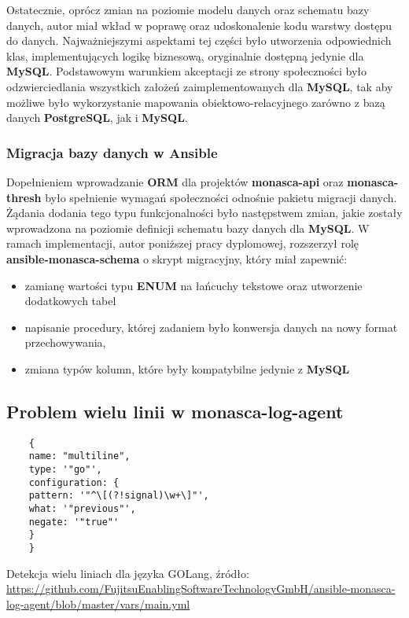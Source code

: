     Ostatecznie, oprócz zmian na poziomie modelu danych oraz schematu bazy danych, autor miał wkład w poprawę oraz udoskonalenie
    kodu warstwy dostępu do danych. Najważniejszymi aspektami tej części było utworzenia odpowiednich klas, implementujących logikę
    biznesową, oryginalnie dostępną jedynie dla \textbf{MySQL}. Podstawowym warunkiem akceptacji ze strony społeczności było
    odzwierciedlania wszystkich założeń zaimplementowanych dla \textbf{MySQL}, tak aby możliwe było wykorzystanie mapowania obiektowo-relacyjnego
    zarówno z bazą danych \textbf{PostgreSQL}, jak i \textbf{MySQL}.
    
    \subsubsection{Migracja bazy danych w Ansible}
    Dopełnieniem wprowadzanie \textbf{ORM} dla projektów \textbf{monasca-api} oraz \textbf{monasca-thresh} było spełnienie
    wymagań społeczności odnośnie pakietu migracji danych. Żądania dodania tego typu funkcjonalności było następstwem zmian, jakie
    zostały wprowadzona na poziomie definicji schematu bazy danych dla \textbf{MySQL}. W ramach implementacji, autor poniższej pracy dyplomowej,
    rozszerzył rolę \textbf{ansible-monasca-schema} o skrypt migracyjny, który miał zapewnić:
    \begin{itemize}
        \item zamianę wartości typu \textbf{ENUM} na łańcuchy tekstowe oraz utworzenie dodatkowych tabel
        \item napisanie procedury, której zadaniem było konwersja danych na nowy format przechowywania,
        \item zmiana typów kolumn, które były kompatybilne jedynie z \textbf{MySQL}
    \end{itemize}

\subsection{Problem wielu linii w monasca-log-agent}
\label{chapter:application_own:own_work:monasca_log_agent}

\begin{listing}[h]
    \begin{verbatim}
    {
    name: "multiline",
    type: '"go"',
    configuration: {
    pattern: '"^\[(?!signal)\w+\]"',
    what: '"previous"',
    negate: '"true"'
    }
    }
    \end{verbatim}
    \caption[Detekcja wielu liniach dla języka GOLang]{
        Detekcja wielu liniach dla języka GOLang, źródło: \url{https://github.com/FujitsuEnablingSoftwareTechnologyGmbH/ansible-monasca-log-agent/blob/master/vars/main.yml}}
    \label{chapter:application_own:own_work:monasca_log_agent:filter_example}
\end{listing}

